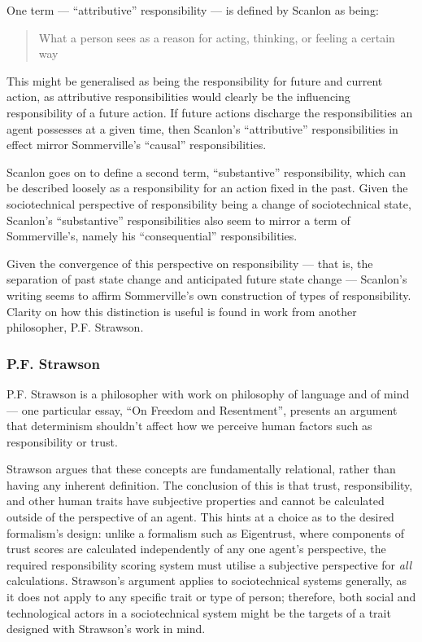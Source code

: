 One term --- ``attributive'' responsibility --- is defined by Scanlon as being:

\begin{quotation}
    What a person sees as a reason for acting, thinking, or feeling a certain way\cite{scanlon2006justice}
\end{quotation}

This might be generalised as being the responsibility for future and current action, as attributive responsibilities would clearly be the influencing responsibility of a future action. If future actions discharge the responsibilities an agent possesses at a given time, then Scanlon's ``attributive'' responsibilities in effect mirror Sommerville's ``causal'' responsibilities.\par

Scanlon goes on to define a second term, ``substantive'' responsibility, which can be described loosely as a responsibility for an action fixed in the past. Given the sociotechnical perspective of responsibility being a change of sociotechnical state, Scanlon's ``substantive'' responsibilities also seem to mirror a term of Sommerville's, namely his ``consequential'' responsibilities.\par

Given the convergence of this perspective on responsibility --- that is, the separation of past state change and anticipated future state change --- Scanlon's writing seems to affirm Sommerville's own construction of types of responsibility. Clarity on how this distinction is useful is found in work from another philosopher, P.F. Strawson.

\subsubsection{P.F. Strawson}  %
P.F. Strawson is a philosopher with work on philosophy of language and of mind --- one particular essay, ``On Freedom and Resentment''\cite{strawson}, presents an argument that determinism shouldn't affect how we perceive human factors such as responsibility or trust.\par

Strawson argues that these concepts are fundamentally relational, rather than having any inherent definition. The conclusion of this is that trust, responsibility, and other human traits have subjective properties and cannot be calculated outside of the perspective of an agent. This hints at a choice as to the desired formalism's design: unlike a formalism such as Eigentrust, where components of trust scores are calculated independently of any one agent's perspective, the required responsibility scoring system must utilise a subjective perspective for \emph{all} calculations. Strawson's argument applies to sociotechnical systems generally, as it does not apply to any specific trait or type of person; therefore, both social and technological actors in a sociotechnical system might be the targets of a trait designed with Strawson's work in mind.\par

